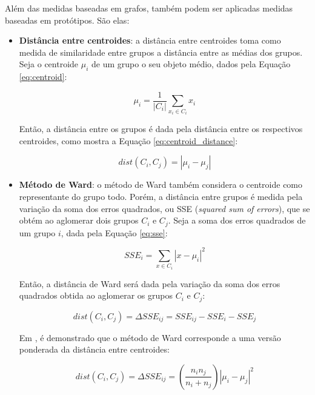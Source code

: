 Além das medidas baseadas em grafos, também podem ser aplicadas medidas baseadas
em protótipos. São elas:

\begin{itemize}
	\item \textbf{Distância entre centroides}: a distância entre centroides toma
	como medida de similaridade entre grupos a distância entre as médias dos
	grupos. Seja o centroide $\mu_i$ de um grupo o seu objeto médio, dados
	pela Equação \ref{eq:centroid}:
	
	\begin{equation}
		\mu_i = \frac{1}{\left|C_i\right|} \sum_{x_i \in C_i}{x_i}
		\label{eq:centroid}
	\end{equation}
	
	Então, a distância entre os grupos é dada pela distância entre os respectivos
	centroides, como mostra a Equação \ref{eq:centroid_distance}:
	
	\begin{equation}
		dist\left(C_i,C_j\right) = \left|\mu_i - \mu_j\right|
		\label{eq:centroid_distance}
	\end{equation}
	
	\item \textbf{Método de Ward}: o método de Ward também considera o centroide
	como representante do grupo todo. Porém, a distância entre grupos é
	medida pela variação da soma dos erros quadrados, ou SSE (\emph{squared sum
	of errors}), que se obtém ao aglomerar dois grupos $C_i$ e $C_j$. Seja a soma
	dos erros quadrados de um grupo $i$, dada pela Equação \ref{eq:sse}:
	
	\begin{equation}
		SSE_i = \sum_{x \in C_i}{{\left| x - \mu_i \right|}^{2}}
		\label{eq:sse}
	\end{equation}
	
	Então, a distância de Ward será dada pela variação da soma dos erros quadrados
	obtida ao aglomerar os grupos $C_i$ e $C_j$:
	
	\begin{equation}
		dist(C_i, C_j) = \Delta SSE_{ij} = SSE_{ij} - SSE_i - SSE_j
		\label{eq:ward}
	\end{equation}
	
	Em \cite{zaki2014data}, é demonstrado que o método de Ward corresponde a uma
	versão ponderada da distância entre centroides:
	
	\begin{equation}
		dist(C_i, C_j) =
			\Delta SSE_{ij} =
			\left( \frac{n_i n_j}{n_i + n_j} \right)
				{\left| \mu_i - \mu_j  \right|}^{2}
		\label{eq:ward_weighted}
	\end{equation}
	
\end{itemize}

